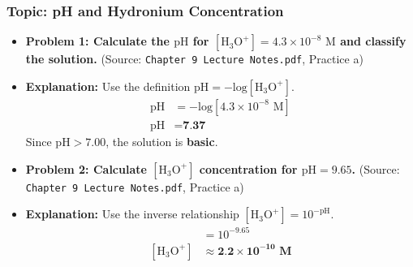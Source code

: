 \documentclass{article}
\begin{document}
\subsubsection*{Topic: pH and Hydronium Concentration}

\begin{itemize}
    \item \textbf{Problem 1: Calculate the $\text{pH}$ for $[\text{H}_3\text{O}^+] = 4.3 \times 10^{-8} \text{ M}$ and classify the solution.} (Source: \texttt{Chapter 9 Lecture Notes.pdf}, Practice a)

    \item \textbf{Explanation:} Use the definition $\text{pH} = -\text{log}[\text{H}_3\text{O}^+]$.
    \begin{align*}
        \text{pH} &= -\text{log}[4.3 \times 10^{-8} \text{ M}] \\
        \text{pH} &= \textbf{7.37}
    \end{align*}
    Since $\text{pH} > 7.00$, the solution is \textbf{basic}.

    \item \textbf{Problem 2: Calculate $[\text{H}_3\text{O}^+]$ concentration for $\text{pH} = 9.65$.} (Source: \texttt{Chapter 9 Lecture Notes.pdf}, Practice a)

    \item \textbf{Explanation:} Use the inverse relationship $[\text{H}_3\text{O}^+] = 10^{-\text{pH}}$.
    \begin{align*}
        [\text{H}_3\text{O}^+] &= 10^{-9.65} \\
        [\text{H}_3\text{O}^+] &\approx \textbf{2.2} \times \mathbf{10^{-10} \text{ M}}
    \end{align*}
\end{itemize}

\bigskip %

\newpage

\end{document}
